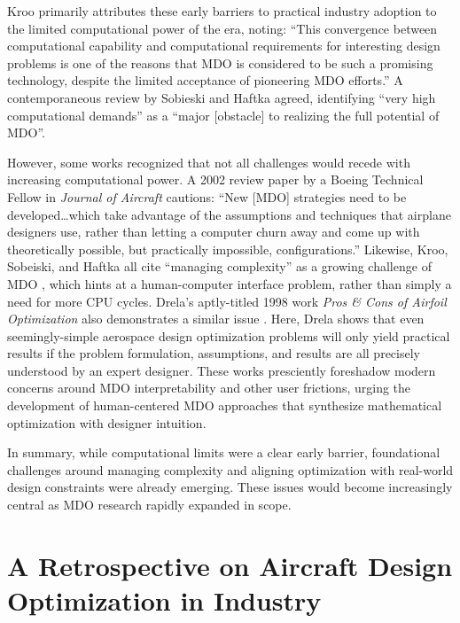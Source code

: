 \documentclass[12pt,vi,oneside]{report}
\begin{document}
    Kroo primarily attributes these early barriers to practical industry adoption to the limited computational power of the era, noting: ``This convergence between computational capability and computational requirements for interesting design problems is one of the reasons that MDO is considered to be such a promising technology, despite the limited acceptance of pioneering MDO efforts.'' A contemporaneous review by Sobieski and Haftka agreed, identifying ``very high computational demands'' as a ``major [obstacle] to realizing the full potential of MDO''. \cite{haftka_multidisciplinary_1997}

    However, some works recognized that not all challenges would recede with increasing computational power. A 2002 review paper by a Boeing Technical Fellow in \textit{Journal of Aircraft} \cite{mcmasters_airplane_2002} cautions: ``New [MDO] strategies need to be developed\dots which take advantage of the assumptions and techniques that airplane designers use, rather than letting a computer churn away and come up with theoretically possible, but practically impossible, configurations.'' Likewise, Kroo, Sobeiski, and Haftka all cite ``managing complexity'' as a growing challenge of MDO \cite{kroo_multidisciplinary_1997, haftka_multidisciplinary_1997}, which hints at a human-computer interface problem, rather than simply a need for more CPU cycles. Drela's aptly-titled 1998 work \textit{Pros \& Cons of Airfoil Optimization} also demonstrates a similar issue \cite{drela_pros_1998}. Here, Drela shows that even seemingly-simple aerospace design optimization problems will only yield practical results if the problem formulation, assumptions, and results are all precisely understood by an expert designer. These works presciently foreshadow modern concerns around MDO interpretability and other user frictions, urging the development of human-centered MDO approaches that synthesize mathematical optimization with designer intuition.

    In summary, while computational limits were a clear early barrier, foundational challenges around managing complexity and aligning optimization with real-world design constraints were already emerging. These issues would become increasingly central as MDO research rapidly expanded in scope.


    \section{A Retrospective on Aircraft Design Optimization in Industry}
\end{document}
